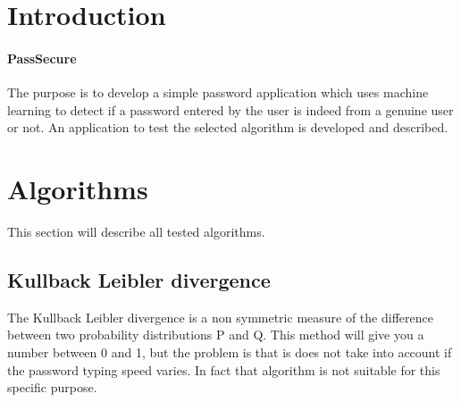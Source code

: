 \documentclass[fleqn,10pt]{SelfArx} %
\begin{document}
\flushbottom %

\maketitle %

\tableofcontents %

\thispagestyle{empty} %


\section*{Introduction} %


\paragraph{PassSecure}The purpose is to develop a simple password application which uses machine learning to detect if a password entered by the user is indeed from a genuine user or not. An application to test the selected algorithm is developed and described.


\section{Algorithms}

This section will describe all tested algorithms.

\subsection{Kullback Leibler divergence}
The Kullback Leibler divergence is a non symmetric measure of the difference between two probability distributions P and Q.\cite{kullback} This method will give you a number between 0 and 1, but the problem is that is does not take into account if the password typing speed varies. In fact that algorithm is not suitable for this specific purpose.
\end{document}
